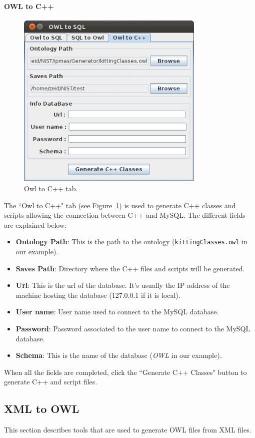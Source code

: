 \paragraph{OWL to C++}
\begin{figure}[h!t!]
\centering
\includegraphics[width=9cm]{Figure/OWL2C++.jpeg}
\caption{Owl to C++ tab.}
\label{fig:owl2C++}
\end{figure}
The ``Owl to C++" tab (see Figure~\ref{fig:owl2C++}) is used to generate C++ classes and scripts allowing the connection between C++ and MySQL. The different fields are explained below:
\begin{itemize}
\item \textbf{Ontology Path}: This is the path to the ontology (\texttt{kittingClasses.owl} in our example).
\item \textbf{Saves Path}: Directory where the C++ files and scripts will be generated.
\item \textbf{Url}: This is the url of the database. It's usually the IP address of the machine hosting the database (127.0.0.1 if it is local).
\item \textbf{User name}: User name used to connect to the MySQL database.
\item \textbf{Password}: Password associated to the user name to connect to the MySQL database.
\item \textbf{Schema}: This is the name of the database (\textit{OWL} in our example).
\end{itemize}

When all the fields are completed, click the ``Generate C++ Classes" button to generate C++ and script files.

\subsection{XML to OWL}\label{xml2owl}
This section describes tools that are used to generate OWL files from XML files.
